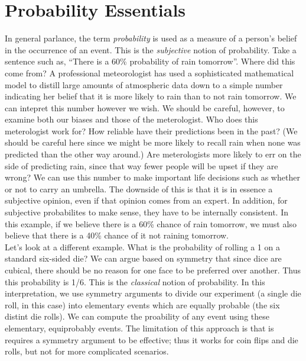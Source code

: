 \documentclass[12pt]{article}
\theoremstyle{definition}
\theoremstyle{remark}
\begin{document}
\section{Probability Essentials}
In general parlance, the term \emph{probability} is used as a measure of a person's belief in the occurrence of an event. This is the \emph{subjective} notion of probability. Take a sentence such as, ``There is a 60\% probability of rain tomorrow''. Where did this come from? A professional meteorologist has used a sophisticated mathematical model to distill large amounts of atmospheric data down to a simple number indicating her belief that it is more likely to rain than to not rain tomorrow. We can intepret this number however we wish. We should be careful, however, to examine both our biases and those of the meterologist. Who does this meterologist work for? How reliable have their predictions been in the past? (We should be careful here since we might be more likely to recall rain when none was predicted than the other way around.) Are meterologists more likely to err on the side of predicting rain, since that way fewer people will be upset if they are wrong? We can use this number to make important life decisions such as whether or not to carry an umbrella. The downside of this is that it is in essence a subjective opinion, even if that opinion comes from an expert. In addition, for subjective probabilites to make sense, they have to be internally consistent. In this example, if we believe there is a 60\% chance of rain tomorrow, we must also believe that there is a 40\% chance of it not raining tomorrow.
\\

Let's look at a different example. What is the probability of rolling a 1 on a standard six-sided die? We can argue based on symmetry that since dice are cubical, there should be no reason for one face to be preferred over another. Thus this probability is 1/6. This is the \emph{classical} notion of probability. In this interpretation, we use symmetry arguments to divide our experiment (a single die roll, in this case) into elementary events which are equally probable (the six distint die rolls). We can compute the proability of any event using these elementary, equiprobably events. The limitation of this approach is that is requires a symmetry argument to be effective; thus it works for coin flips and die rolls, but not for more complicated scenarios.\\
\end{document}

